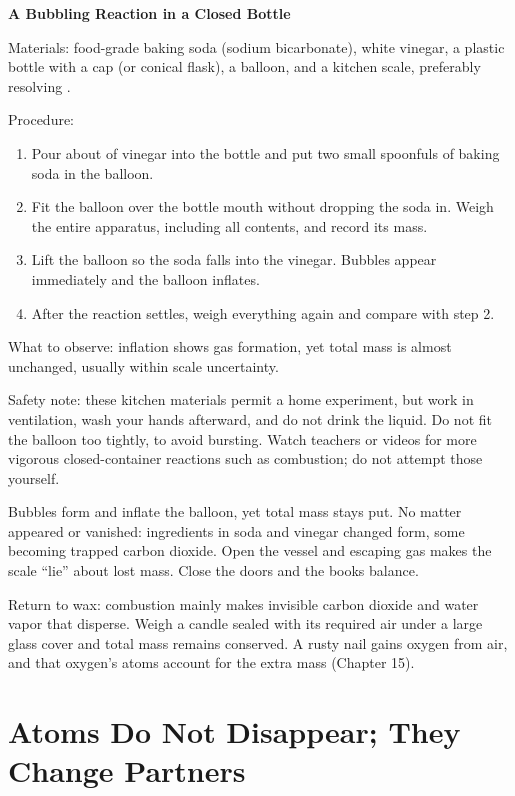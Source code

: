 \begin{shiyan}
\textbf{A Bubbling Reaction in a Closed Bottle}

Materials: food-grade baking soda (sodium bicarbonate), white vinegar, a plastic bottle with a cap (or conical flask), a balloon, and a kitchen scale, preferably resolving .

Procedure:
\begin{enumerate}[itemsep=1pt]
\item Pour about  of vinegar into the bottle and put two small spoonfuls of baking soda in the balloon.
\item Fit the balloon over the bottle mouth without dropping the soda in. Weigh the entire apparatus, including all contents, and record its mass.
\item Lift the balloon so the soda falls into the vinegar. Bubbles appear immediately and the balloon inflates.
\item After the reaction settles, weigh everything again and compare with step 2.
\end{enumerate}

What to observe: inflation shows gas formation, yet total mass is almost unchanged, usually within scale uncertainty.

Safety note: these kitchen materials permit a home experiment, but work in ventilation, wash your hands afterward, and do not drink the liquid. Do not fit the balloon too tightly, to avoid bursting. Watch teachers or videos for more vigorous closed-container reactions such as combustion; do not attempt those yourself.
\end{shiyan}

Bubbles form and inflate the balloon, yet total mass stays put. No matter appeared or vanished: ingredients in soda and vinegar changed form, some becoming trapped carbon dioxide. Open the vessel and escaping gas makes the scale ``lie'' about lost mass. Close the doors and the books balance.

Return to wax: combustion mainly makes invisible carbon dioxide and water vapor that disperse. Weigh a candle sealed with its required air under a large glass cover and total mass remains conserved. A rusty nail gains oxygen from air, and that oxygen's atoms account for the extra mass (Chapter 15).

\section{Atoms Do Not Disappear; They Change Partners}

